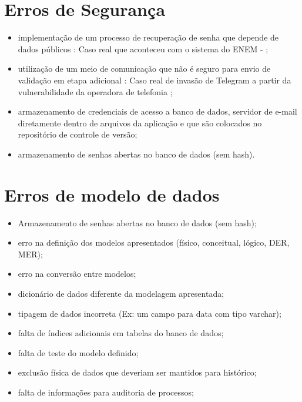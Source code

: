 \section{Erros de Segurança}

\begin{itemize}
    \item implementação de um processo de recuperação de senha que depende de dados públicos : 
    Caso real que aconteceu com o sistema do ENEM - ;
    
    \item utilização de um meio de comunicação que não é seguro para envio de validação em etapa adicional : Caso real de invasão de Telegram a partir da vulnerabilidade da operadora de telefonia \cite{invasao_telegram};
    
    \item armazenamento de credenciais de acesso a banco de dados, servidor de e-mail diretamente dentro de arquivos da aplicação e que são colocados no repositório de controle de versão;
    
    \item armazenamento de senhas abertas no banco de dados (sem hash).
\end{itemize}

\section{Erros de modelo de dados}

\begin{itemize}
    \item Armazenamento de senhas abertas no banco de dados (sem hash);
    
    \item erro na definição dos modelos apresentados (físico, conceitual, lógico, DER, MER);
    
    \item erro na conversão entre modelos;
    
    \item dicionário de dados diferente da modelagem apresentada;
    
    \item tipagem de dados incorreta (Ex: um campo para data com tipo varchar);
    
    \item falta de índices adicionais em tabelas do banco de dados;

    \item falta de teste do modelo definido;
    
    \item exclusão física de dados que deveriam ser mantidos para histórico;
    
    \item falta de informações para auditoria de processos;
    
    
    
\end{itemize}

